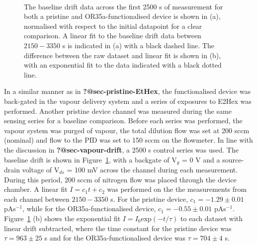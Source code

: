 \documentclass[
  a4paper,
]{scrbook}
\begin{document}
\begin{figure}
\begin{minipage}[t]{0.70\linewidth}
{{}

}

\end{minipage}%
%
\begin{minipage}[t]{0.15\linewidth}

{\centering 

~

}

\end{minipage}%

\caption{\label{fig-OR35a-baseline-drift}The baseline drift data across
the first 2500 s of measurement for both a pristine and
OR35a-functionalised device is shown in (a), normalised with respect to
the initial datapoint for a clear comparison. A linear fit to the
baseline drift data between \(2150-3350\) s is indicated in (a) with a
black dashed line. The difference between the raw dataset and linear fit
is shown in (b), with an exponential fit to the data indicated with a
black dotted line.}

\end{figure}

In a similar manner as in \textbf{?@sec-pristine-EtHex}, the
functionalised device was back-gated in the vapour delivery system and a
series of exposures to E2Hex was performed. Another pristine device
channel was measured during the same sensing series for a baseline
comparison. Before each series was performed, the vapour system was
purged of vapour, the total dilution flow was set at 200 sccm (nominal)
and flow to the PID was set to 150 sccm on the flowmeter. In line with
the discussion in \textbf{?@sec-vapour-drift}, a 2500 s control series
was used. The baseline drift is shown in
Figure~\ref{fig-OR35a-baseline-drift}, with a backgate of V\(_g\) = 0 V
and a source-drain voltage of V\(_{ds}\) = 100 mV across the channel
during each measurement. During this period, 200 sccm of nitrogen flow
was placed through the device chamber. A linear fit \(I = c_1t + c_2\)
was performed on the the measurements from each channel between
\(2150-3350\) s. For the pristine device, \(c_1 = -1.29\pm0.01\)
pAs\(^{-1}\), while for the OR35a-functionalised device,
\(c_1 = -0.55\pm0.01\) pAs\(^{-1}\).
Figure~\ref{fig-OR35a-baseline-drift} (b) shows the exponential fit
\(I = I_0\textrm{exp}(-t/\tau)\) to each dataset with linear drift
subtracted, where the time constant for the pristine device was
\(\tau = 963 \pm 25\) s and for the OR35a-functionalised device was
\(\tau = 704 \pm 4\) s.
\end{document}
